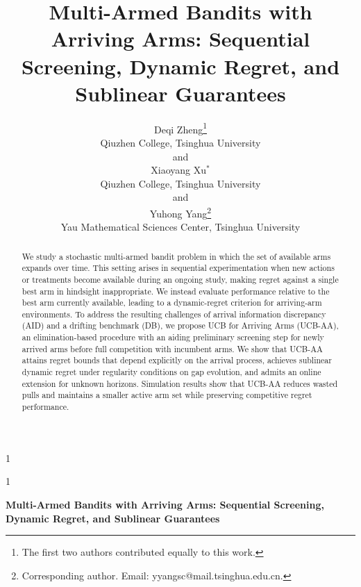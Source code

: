 \documentclass[
  12pt]{article}
\newcommand{\anon}{1}
\begin{document}
\def\spacingset#1{\renewcommand{\baselinestretch}%
{#1}\small\normalsize} \spacingset{1}




\anon
{
  \title{\bf Multi-Armed Bandits with Arriving Arms: Sequential Screening, Dynamic Regret, and Sublinear Guarantees}
  \author{Deqi Zheng\thanks{
    The first two authors contributed equally to this work.}\\
    Qiuzhen College, Tsinghua University \\
    and \\
    Xiaoyang Xu$^*$ \\
    Qiuzhen College, Tsinghua University\\
    and \\
    Yuhong Yang\thanks{
    Corresponding author. Email: yyangsc@mail.tsinghua.edu.cn.}\hspace{.2cm}\\
    Yau Mathematical Sciences Center, Tsinghua University
    }
  \maketitle
} \fi

\anon
{
  \bigskip
  \bigskip
  \bigskip
  \begin{center}
    {\LARGE\bf Multi-Armed Bandits with Arriving Arms: Sequential Screening, Dynamic Regret, and Sublinear Guarantees}
\end{center}
  \medskip
} \fi

\bigskip
\begin{abstract}
We study a stochastic multi-armed bandit problem in which the set of available arms expands over time. This setting arises in sequential experimentation when new actions or treatments become available during an ongoing study, making regret against a single best arm in hindsight inappropriate. We instead evaluate performance relative to the best arm currently available, leading to a dynamic-regret criterion for arriving-arm environments. To address the resulting challenges of arrival information discrepancy (AID) and a drifting benchmark (DB), we propose UCB for Arriving Arms (UCB-AA), an elimination-based procedure with an aiding preliminary screening step for newly arrived arms before full competition with incumbent arms. We show that UCB-AA attains regret bounds that depend explicitly on the arrival process, achieves sublinear dynamic regret under regularity conditions on gap evolution, and admits an online extension for unknown horizons. Simulation results show that UCB-AA reduces wasted pulls and maintains a smaller active arm set while preserving competitive regret performance.
\end{abstract}
\end{document}
